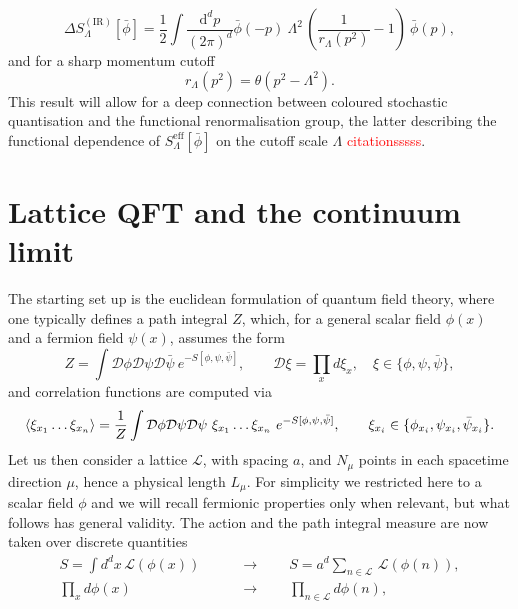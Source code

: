 \begin{equation} 
    \Delta S_{\Lambda}^{(\mathrm{IR})}[\bar\phi] = \frac{1}{2} \int \frac{\mathrm{d}^d p}{(2 \pi)^d} \bar\phi(-p) \ \Lambda^2 \, \left(\frac{1}{r_{\Lambda}(p^2)}-1\right) \ \bar\phi(p),
\end{equation}
and for a sharp momentum cutoff 
\begin{equation*}
    r_{\Lambda}(p^2) = \theta\left(p^2-\Lambda^2\right).
\end{equation*}
This result will allow for a deep connection between coloured stochastic quantisation and the functional renormalisation group, the latter describing the functional dependence of $S_\Lambda^\text{eff}[\bar\phi]$ on the cutoff scale $\Lambda$ \textcolor{red}{citationsssss}.


\section{Lattice QFT and the continuum limit}
\label{sec:lattice_continuum_}
The starting set up is the euclidean formulation of quantum field theory, where one typically defines a path integral $Z$, which, for a general scalar field $\phi(x)$ and a fermion field $\psi(x)$, assumes the form
\begin{equation}
    Z = \int \mathcal{D}\phi\mathcal{D}\psi\mathcal{D}\bar\psi \ e^{-S[\phi, \psi, \bar\psi]}, \qquad \mathcal{D}\xi = \prod_x d\xi_x, \quad \xi \in \{\phi, \psi, \bar\psi\},
    \label{eq:path_integral_generic}
\end{equation}
and correlation functions are computed via
\begin{equation*}
        \left\langle \xi_{x_1} \dots \xi_{x_n}  \right\rangle = \frac{1}{Z} \int \mathcal{D}\phi\mathcal{D}\psi\mathcal{D}\psi \ \xi_{x_1} \dots \xi_{x_n} \ e^{-S[\phi, \psi, \bar\psi]}, \qquad \xi_{x_i} \in \{\phi_{x_i}, \psi_{x_i}, \bar\psi_{x_i}\}. \\
\end{equation*}
Let us then consider a lattice $\mathscr{L}$, with spacing $a$, and $N_\mu$ points in each spacetime direction $\mu$, hence a physical length $L_\mu$.
For simplicity we restricted here to a scalar field $\phi$ and we will recall fermionic properties only when relevant, but what follows has general validity. 
The action and the path integral measure are now taken over discrete quantities 
\begin{equation*}
    \begin{aligned}
	    S = \int d^dx \, \mathcal{L}(\phi(x)) \qquad &\to \qquad S = a^d \sum_{n \in \mathscr{L}} \, \mathcal{L}(\phi(n)), \\
        \prod_{x} d\phi(x) \qquad &\to  \qquad \prod_{n \in \mathscr{L}} d\phi(n),
    \end{aligned}
\end{equation*}
